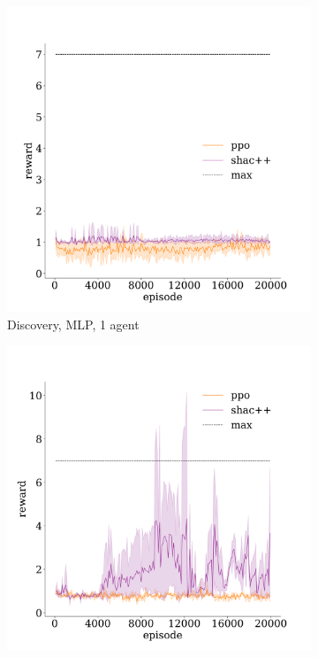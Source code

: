 \begin{figure}[!t]
    \begin{subfigure}[b]{0.32\textwidth}
        \includegraphics[width=\textwidth]{figs/discovery-1-mlp.pdf}
        \caption{Discovery, MLP, 1 agent}
        \label{fig:discovery-mlp-1}
    \end{subfigure}
    \begin{subfigure}[b]{0.32\textwidth}
        \includegraphics[width=\textwidth]{figs/discovery-3-transformer.pdf}

\end{subfigure}
\end{figure}
